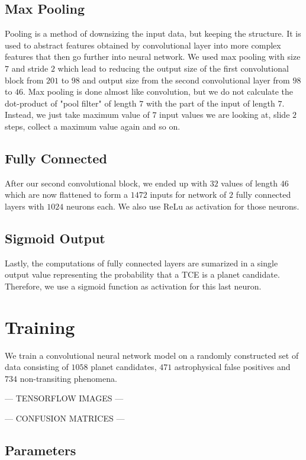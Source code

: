 \documentclass[twoside]{article}
\begin{document}
\begin{multicols}{2}
\subsection{Max Pooling}
Pooling is a method of downsizing the input data, but keeping the structure. It is used to abstract features obtained by convolutional layer into more complex features that then go further into neural network. We used max pooling with size $7$ and stride $2$ which lead to reducing the output size of the first convolutional block from $201$ to $98$ and output size from the second convolutional layer from $98$ to $46$. Max pooling is done almost like convolution, but we do not calculate the dot-product of "pool filter" of length $7$ with the part of the input of length $7$. Instead, we just take maximum value of $7$ input values we are looking at, slide $2$ steps, collect a maximum value again and so on.

\subsection{Fully Connected}
After our second convolutional block, we ended up with $32$ values of length $46$ which are now flattened to form a $1472$ inputs for network of $2$ fully connected layers with $1024$ neurons each. We also use ReLu as activation for those neurons.

\subsection{Sigmoid Output}
Lastly, the computations of fully connected layers are sumarized in a single output value representing the probability that a TCE is a planet candidate. Therefore, we use a sigmoid function as activation for this last neuron.


\section{Training}
We train a convolutional neural network model on a randomly constructed set of data consisting of $1058$ planet candidates, $471$ astrophysical false positives and $734$ non-transiting phenomena.

--- TENSORFLOW IMAGES ---

--- CONFUSION MATRICES ---

\subsection{Parameters}


\end{multicols}
\end{document}
